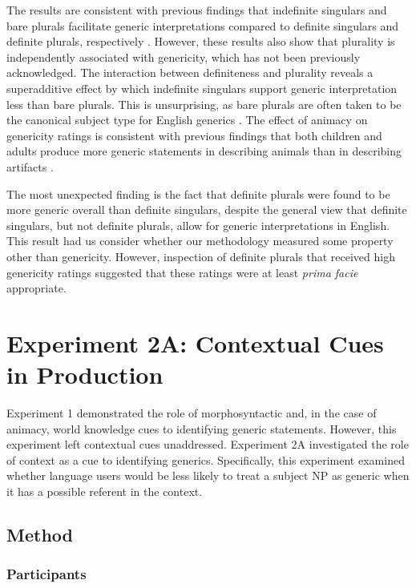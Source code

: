 \documentclass[10pt,letterpaper]{article}
\begin{document}
The results are consistent with previous findings that indefinite singulars and bare plurals facilitate generic interpretations compared to definite singulars and definite plurals, respectively \cite{Cimpian:2011, Gelman:2003}. However, these results also show that plurality is independently associated with genericity, which has not been previously acknowledged. The interaction between definiteness and plurality reveals a superadditive effect by which indefinite singulars support generic interpretation less than bare plurals. This is unsurprising, as bare plurals are often taken to be the canonical subject type for English generics \cite{Carlson:1977,Krifka:1995,Lyons:1977}. The effect of animacy on genericity ratings is consistent with previous findings that both children and adults produce more generic statements in describing animals than in describing artifacts \cite{Brandone:2009}.

The most unexpected finding is the fact that definite plurals were found to be more generic overall than definite singulars, despite the general view that definite singulars, but not definite plurals, allow for generic interpretations in English. This result had us consider whether our methodology measured some property other than genericity. However, inspection of definite plurals that received high genericity ratings suggested that these ratings were at least \emph{prima facie} appropriate.

\section{Experiment 2A: Contextual Cues in Production}

Experiment 1 demonstrated the role of morphosyntactic and, in the case of animacy, world knowledge cues to identifying generic statements. However, this experiment left contextual cues unaddressed. Experiment 2A investigated the role of context as a cue to identifying generics. Specifically, this experiment examined whether language users would be less likely to treat a subject NP as generic when it has a possible referent in the context.

\subsection{Method}

\subsubsection{Participants} 
\end{document}
